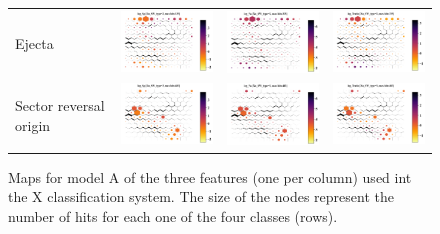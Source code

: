 \documentclass[utf8]{frontiersSCNS} %
\begin{document}
\begin{figure}[h!]
\begin{tabular}{m{2.5cm}CCC}
		Ejecta & \includegraphics[width=4.5cm]{Amaya/SWtype-Xu_SW_type-2-log_Sp} &
		\includegraphics[width=4.5cm]{Amaya/SWtype-Xu_SW_type-2-log_Va} &
		\includegraphics[width=4.5cm]{Amaya/SWtype-Xu_SW_type-2-log_Tratio} \hfill	\\
		
		Sector reversal origin & \includegraphics[width=4.5cm]{Amaya/SWtype-Xu_SW_type-3-log_Sp} &
		\includegraphics[width=4.5cm]{Amaya/SWtype-Xu_SW_type-3-log_Va} &
		\includegraphics[width=4.5cm]{Amaya/SWtype-Xu_SW_type-3-log_Tratio} \hfill	\\
	\end{tabular}
	\caption{Maps for model A of the three features (one per column) used int the X classification system. The size of the nodes represent the number of hits for each one of the four classes (rows).}\label{fig:SWtXu}
\end{figure}
\end{document}
